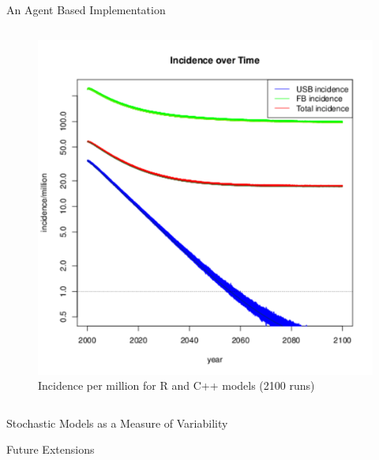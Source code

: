 \documentclass[final]{beamer}
\begin{document}
\begin{frame}
\begin{columns}
\begin{column}{.3\textwidth}
\begin{block}{An Agent Based Implementation}
\begin{block}{}
\begin{column}{.45\textwidth}
\begin{figure}[h]
\begin{center}
                \includegraphics[width=\textwidth]{finalRunSmall}
              \end{center}
              \caption{Incidence per million for R and C++ models (2100 runs)}
              \label{fig:finalRun}
            \end{figure}
          \end{column}
        \end{block}
      \end{block}
      
      \begin{block}{Stochastic Models as a Measure of Variability}
      \end{block}
      
      \begin{block}{Future Extensions}
      \end{block}
      
    \end{column}
  \end{columns}
\end{frame}
\end{document}
